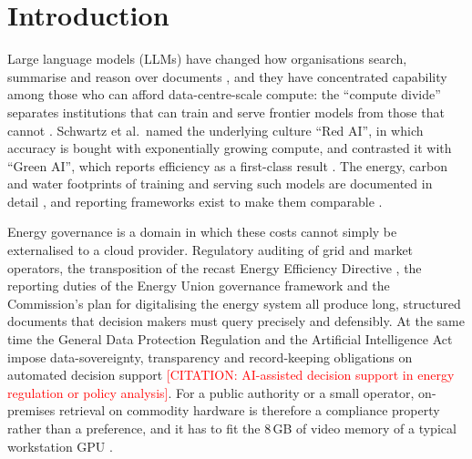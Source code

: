 \documentclass[pdflatex,sn-mathphys-num]{sn-jnl}
\newcommand{\todo}[1]{\textcolor{red}{#1}}
\theoremstyle{thmstyleone}%
\theoremstyle{thmstylethree}%
\begin{document}

\maketitle

\section{Introduction}\label{sec:intro}

Large language models (LLMs) have changed how organisations search, summarise and reason over documents \cite{bengioetal2003,zhu2025informationretrieval}, and they have concentrated capability among those who can afford data-centre-scale compute: the ``compute divide'' separates institutions that can train and serve frontier models from those that cannot \cite{besiroglu2024computedividemachinelearning,sevilla2022compute,thompson2020computational,hooker2021hardware}. Schwartz et al.\ named the underlying culture ``Red AI'', in which accuracy is bought with exponentially growing compute, and contrasted it with ``Green AI'', which reports efficiency as a first-class result \cite{schwartz2020green}. The energy, carbon and water footprints of training and serving such models are documented in detail \cite{strubell2019energycost,patterson2021carbon,Luccioni_2024,li2025makingaithirstyuncovering,devries2023growing,wu2022sustainable}, and reporting frameworks exist to make them comparable \cite{henderson2020systematic,lacoste2019quantifyingcarbonemissionsmachine,lannelongue2021green,tabbakh2024GreenAI}.

Energy governance is a domain in which these costs cannot simply be externalised to a cloud provider. Regulatory auditing of grid and market operators, the transposition of the recast Energy Efficiency Directive \cite{eueed2023}, the reporting duties of the Energy Union governance framework \cite{eugovernance2018} and the Commission's plan for digitalising the energy system \cite{eu2022digitalising} all produce long, structured documents that decision makers must query precisely and defensibly. At the same time the General Data Protection Regulation \cite{gdpr2016} and the Artificial Intelligence Act \cite{euaiact2024} impose data-sovereignty, transparency and record-keeping obligations on automated decision support \todo{[CITATION: AI-assisted decision support in energy regulation or policy analysis]}. For a public authority or a small operator, on-premises retrieval on commodity hardware is therefore a compliance property rather than a preference, and it has to fit the 8\,GB of video memory of a typical workstation GPU \cite{zhou2019edge}.
\end{document}
